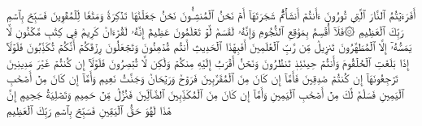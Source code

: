 أَفَرَءَيۡتُمُ ٱلنَّارَ ٱلَّتِي تُورُونَ
ءَأَنتُمۡ أَنشَأۡتُمۡ شَجَرَتَهَآ أَمۡ نَحۡنُ ٱلۡمُنشِـُٔونَ
نَحۡنُ جَعَلۡنَٰهَا تَذۡكِرَةٗ وَمَتَٰعٗا لِّلۡمُقۡوِينَ
فَسَبِّحۡ بِٱسۡمِ رَبِّكَ ٱلۡعَظِيمِ
۞فَلَآ أُقۡسِمُ بِمَوَٰقِعِ ٱلنُّجُومِ
وَإِنَّهُۥ لَقَسَمٞ لَّوۡ تَعۡلَمُونَ عَظِيمٌ
إِنَّهُۥ لَقُرۡءَانٞ كَرِيمٞ
فِي كِتَٰبٖ مَّكۡنُونٖ
لَّا يَمَسُّهُۥٓ إِلَّا ٱلۡمُطَهَّرُونَ
تَنزِيلٞ مِّن رَّبِّ ٱلۡعَٰلَمِينَ
أَفَبِهَٰذَا ٱلۡحَدِيثِ أَنتُم مُّدۡهِنُونَ
وَتَجۡعَلُونَ رِزۡقَكُمۡ أَنَّكُمۡ تُكَذِّبُونَ
فَلَوۡلَآ إِذَا بَلَغَتِ ٱلۡحُلۡقُومَ
وَأَنتُمۡ حِينَئِذٖ تَنظُرُونَ
وَنَحۡنُ أَقۡرَبُ إِلَيۡهِ مِنكُمۡ وَلَٰكِن لَّا تُبۡصِرُونَ
فَلَوۡلَآ إِن كُنتُمۡ غَيۡرَ مَدِينِينَ
تَرۡجِعُونَهَآ إِن كُنتُمۡ صَٰدِقِينَ
فَأَمَّآ إِن كَانَ مِنَ ٱلۡمُقَرَّبِينَ
فَرَوۡحٞ وَرَيۡحَانٞ وَجَنَّتُ نَعِيمٖ
وَأَمَّآ إِن كَانَ مِنۡ أَصۡحَٰبِ ٱلۡيَمِينِ
فَسَلَٰمٞ لَّكَ مِنۡ أَصۡحَٰبِ ٱلۡيَمِينِ
وَأَمَّآ إِن كَانَ مِنَ ٱلۡمُكَذِّبِينَ ٱلضَّآلِّينَ
فَنُزُلٞ مِّنۡ حَمِيمٖ
وَتَصۡلِيَةُ جَحِيمٍ
إِنَّ هَٰذَا لَهُوَ حَقُّ ٱلۡيَقِينِ
فَسَبِّحۡ بِٱسۡمِ رَبِّكَ ٱلۡعَظِيمِ